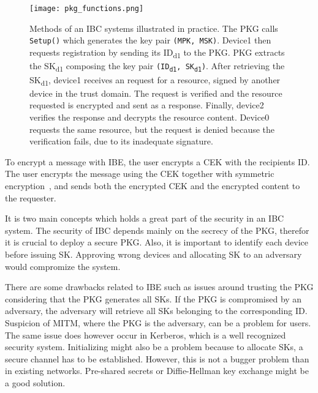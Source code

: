 \begin{figure}[ht]
  \centering
  \texttt{[image: pkg\_functions.png]}
  \caption[IBC methods]{Methods of an IBC systems illustrated in practice.
  The PKG calls \texttt{Setup()} which generates the key pair \texttt{(MPK, MSK)}.
  Device1 then requests registration by sending its ID\textsubscript{d1} to the PKG.
  PKG extracts the SK\textsubscript{d1} composing the key pair \texttt{(ID\textsubscript{d1}, SK\textsubscript{d1})}.
  After retrieving the SK\textsubscript{d1}, device1 receives an request for a resource, signed by another device in the trust domain.
  The request is verified and the resource requested is encrypted and sent as a response.
  Finally, device2 verifies the response and decrypts the resource content.
  Device0 requests the same resource, but the request is denied because the verification fails, due to its inadequate signature.}
  \label{fig:pkg_functions}
\end{figure}

To encrypt a message with \gls{IBE}, the user encrypts a \gls{CEK} with the recipients \gls{ID}.
The user encrypts the message using the \gls{CEK} together with symmetric encryption~\cite[section 2.2.2]{rfc5408}, and sends both the encrypted \gls{CEK} and the encrypted content to the requester. 

It is two main concepts which holds a great part of the security in an \gls{IBC} system.
The security of \gls{IBC} depends mainly on the secrecy of the \gls{PKG}, therefor it is crucial to deploy a secure \gls{PKG}.
Also, it is important to identify each device before issuing \gls{SK}.
Approving wrong devices and allocating \gls{SK} to an adversary would compromize the system.

There are some drawbacks related to \gls{IBE} such as issues around trusting the \gls{PKG} considering that the \gls{PKG} generates all \gls{SK}s.  
If the \gls{PKG} is compromised by an adversary, the adversary will retrieve all \gls{SK}s belonging to the corresponding \gls{ID}. 
Suspicion of \gls{MITM}, where the \gls{PKG} is the adversary, can be a problem for users.
The same issue does however occur in Kerberos, which is a well recognized security system.
Initializing might also be a problem because to allocate \gls{SK}s, a secure channel has to be established. 
However, this is not a bugger problem than in existing networks. 
Pre-shared secrets or Diffie-Hellman key exchange might be a good solution.

